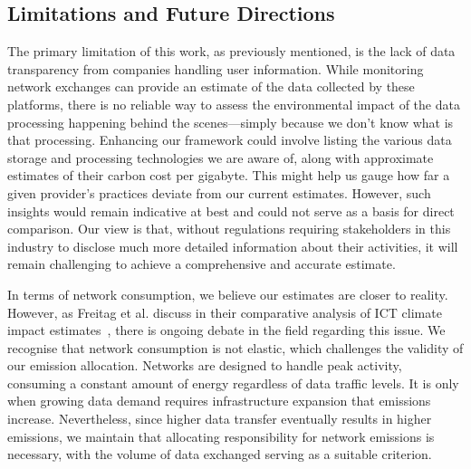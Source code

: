 \documentclass[sigconf,9pt,usenames,dvipsnames,table]{acmart}
\begin{document}
\subsection{Limitations and Future Directions}

The primary limitation of this work, as previously mentioned, is the lack of data transparency from companies handling user information. While monitoring network exchanges can provide an estimate of the data collected by these platforms, there is no reliable way to assess the environmental impact of the data processing happening behind the scenes—simply because we don’t know what is that processing. Enhancing our framework could involve listing the various data storage and processing technologies we are aware of, along with approximate estimates of their carbon cost per gigabyte. This might help us gauge how far a given provider's practices deviate from our current estimates. However, such insights would remain indicative at best and could not serve as a basis for direct comparison. Our view is that, without regulations requiring stakeholders in this industry to disclose
much more detailed information about their activities, it will remain challenging to achieve a
comprehensive and accurate estimate.

In terms of network consumption, we believe our estimates are closer to reality. However, as Freitag et al. discuss in their comparative analysis of ICT climate impact estimates~\cite{freitag_real_2021}, there is ongoing debate in the field regarding this issue. We recognise that network consumption is not elastic, which challenges the validity of our emission allocation. Networks are designed to handle peak activity, consuming a constant amount of energy regardless of data traffic levels. It is only when growing data demand requires infrastructure expansion that emissions increase. Nevertheless, since higher data transfer eventually results in higher emissions, we maintain that allocating responsibility for network emissions is necessary, with the volume of data exchanged serving as a suitable criterion.
\end{document}
